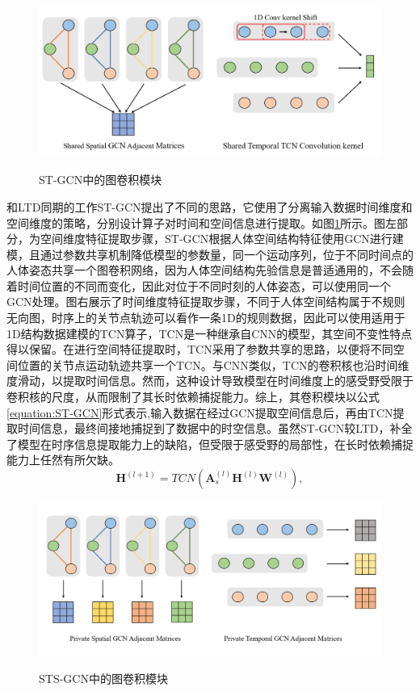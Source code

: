 \begin{figure}[ht]
    \centering
    \includegraphics[width=1\textwidth]{FigMa/ST-GCN.png}\\
    \vspace{-0.3cm}
    \caption{ST-GCN中的图卷积模块}
    \label{fig:ST-GCN_structure}
\end{figure}
和LTD同期的工作ST-GCN\cite{yan2018spatial}提出了不同的思路，它使用了分离输入数据时间维度和空间维度的策略，分别设计算子对时间和空间信息进行提取。如图\ref{fig:ST-GCN_structure}所示。图左部分，为空间维度特征提取步骤，ST-GCN根据人体空间结构特征使用GCN进行建模，且通过参数共享机制降低模型的参数量，同一个运动序列，位于不同时间点的人体姿态共享一个图卷积网络，因为人体空间结构先验信息是普适通用的，不会随着时间位置的不同而变化，因此对位于不同时刻的人体姿态，可以使用同一个GCN处理。图右展示了时间维度特征提取步骤，不同于人体空间结构属于不规则无向图，时序上的关节点轨迹可以看作一条1D的规则数据，因此可以使用适用于1D结构数据建模的TCN\cite{oord2016wavenet}算子，TCN是一种继承自CNN的模型，其空间不变性特点得以保留。在进行空间特征提取时，TCN采用了参数共享的思路，以便将不同空间位置的关节点运动轨迹共享一个TCN。与CNN类似，TCN的卷积核也沿时间维度滑动，以提取时间信息。然而，这种设计导致模型在时间维度上的感受野受限于卷积核的尺度，从而限制了其长时依赖捕捉能力。综上，其卷积模块以公式\ref{equation:ST-GCN}形式表示,输入数据在经过GCN提取空间信息后，再由TCN提取时间信息，最终间接地捕捉到了数据中的时空信息。虽然ST-GCN较LTD，补全了模型在时序信息提取能力上的缺陷，但受限于感受野的局部性，在长时依赖捕捉能力上任然有所欠缺。
\begin{equation}
    \mathbf{H}^{(l+1)}= TCN(\mathbf{A}_{s}^{(l)}\mathbf{H}^{(l)}\mathbf{W}^{(l)}),
    \label{equation:ST-GCN}
\end{equation}

\begin{figure}[ht]
    \centering
    \includegraphics[width=1\textwidth]{FigMa/STS-GCN.png}\\
    \vspace{-0.3cm}
    \caption{STS-GCN中的图卷积模块}
    \label{fig:STS-GCN_structure}
\end{figure}

